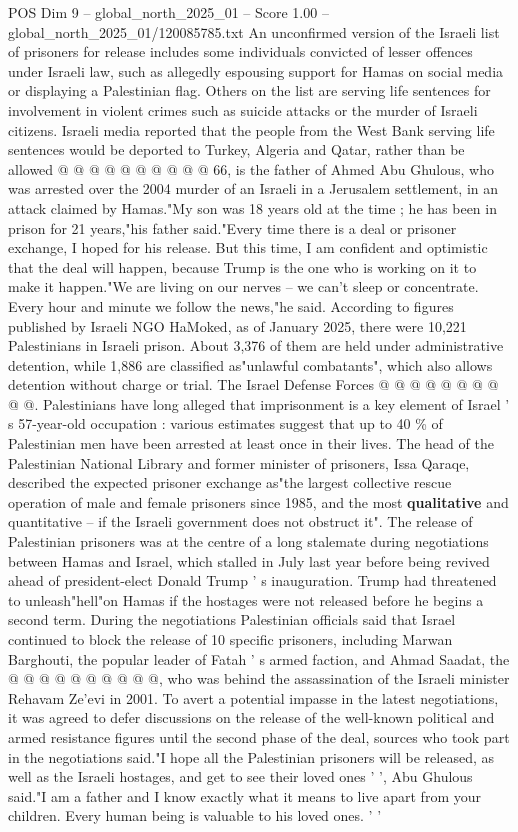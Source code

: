 \begin{textsample}{POS Dim 9 – global\_north\_2025\_01 – Score 1.00 – global\_north\_2025\_01/120085785.txt}
An unconfirmed version of the Israeli list of prisoners for release includes some individuals convicted of lesser offences under Israeli law, such as allegedly espousing support for Hamas on social media or displaying a Palestinian flag.
Others on the list are serving life sentences for involvement in violent crimes such as suicide attacks or the murder of Israeli citizens.
Israeli media reported that the people from the West Bank serving life sentences would be deported to Turkey, Algeria and Qatar, rather than be allowed @ @ @ @ @ @ @ @ @ @ 66, is the father of Ahmed Abu Ghulous, who was arrested over the 2004 murder of an Israeli in a Jerusalem settlement, in an attack claimed by Hamas."My son was 18 years old at the time ; he has been in prison for 21 years,"his father said."Every time there is a deal or prisoner exchange, I hoped for his release.
But this time, I am confident and optimistic that the deal will happen, because Trump is the one who is working on it to make it happen."We are living on our nerves -- we can't sleep or concentrate.
Every hour and minute we follow the news,"he said.
According to figures published by Israeli NGO HaMoked, as of January 2025, there were 10,221 Palestinians in Israeli prison.
About 3,376 of them are held under administrative detention, while 1,886 are classified as"unlawful combatants", which also allows detention without charge or trial.
The Israel Defense Forces @ @ @ @ @ @ @ @ @ @.
Palestinians have long alleged that imprisonment is a key element of Israel ' s 57-year-old occupation : various estimates suggest that up to 40 \% of Palestinian men have been arrested at least once in their lives.
The head of the Palestinian National Library and former minister of prisoners, Issa Qaraqe, described the expected prisoner exchange as"the largest collective rescue operation of male and female prisoners since 1985, and the most \textbf{qualitative} and quantitative -- if the Israeli government does not obstruct it".
The release of Palestinian prisoners was at the centre of a long stalemate during negotiations between Hamas and Israel, which stalled in July last year before being revived ahead of president-elect Donald Trump ' s inauguration.
Trump had threatened to unleash"hell"on Hamas if the hostages were not released before he begins a second term.
During the negotiations Palestinian officials said that Israel continued to block the release of 10 specific prisoners, including Marwan Barghouti, the popular leader of Fatah ' s armed faction, and Ahmad Saadat, the @ @ @ @ @ @ @ @ @ @, who was behind the assassination of the Israeli minister Rehavam Ze'evi in 2001.
To avert a potential impasse in the latest negotiations, it was agreed to defer discussions on the release of the well-known political and armed resistance figures until the second phase of the deal, sources who took part in the negotiations said."I hope all the Palestinian prisoners will be released, as well as the Israeli hostages, and get to see their loved ones ' ', Abu Ghulous said."I am a father and I know exactly what it means to live apart from your children.
Every human being is valuable to his loved ones. ' '

\end{textsample}
